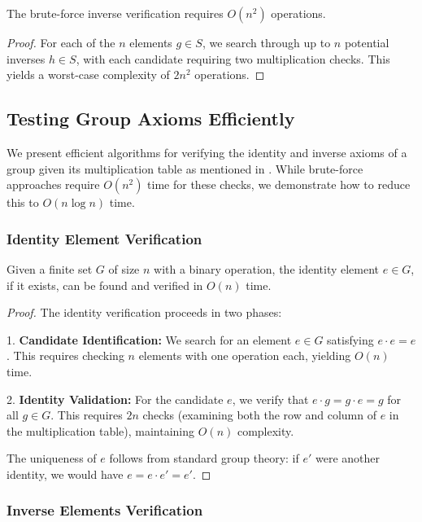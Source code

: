 \documentclass[sigconf]{acmart}
\begin{document}
\begin{proposition}
The brute-force inverse verification requires $O(n^2)$ operations.
\end{proposition}

\begin{proof}
For each of the $n$ elements $g \in S$, we search through up to $n$ potential inverses $h \in S$, with each candidate requiring two multiplication checks. This yields a worst-case complexity of $2n^2$ operations.
\end{proof}

\subsection{Testing Group Axioms Efficiently}
We present efficient algorithms for verifying the identity and inverse axioms of a group given its multiplication table as mentioned in \cite{10756141}. While brute-force approaches require $O(n^2)$ time for these checks, we demonstrate how to reduce this to $O(n\log n)$ time.

\subsubsection{Identity Element Verification}

\begin{theorem}
Given a finite set $G$ of size $n$ with a binary operation, the identity element $e \in G$, if it exists, can be found and verified in $O(n)$ time.
\end{theorem}

\begin{proof} The identity verification proceeds in two phases:

1. \textbf{Candidate Identification:} We search for an element $e \in G$ satisfying $e \cdot e = e$. This requires checking $n$ elements with one operation each, yielding $O(n)$ time.

2. \textbf{Identity Validation:} For the candidate $e$, we verify that $e \cdot g = g \cdot e = g$ for all $g \in G$. This requires $2n$ checks (examining both the row and column of $e$ in the multiplication table), maintaining $O(n)$ complexity.

The uniqueness of $e$ follows from standard group theory: if $e'$ were another identity, we would have $e = e \cdot e' = e'$.
\end{proof}

\subsubsection{Inverse Elements Verification}
\end{document}
